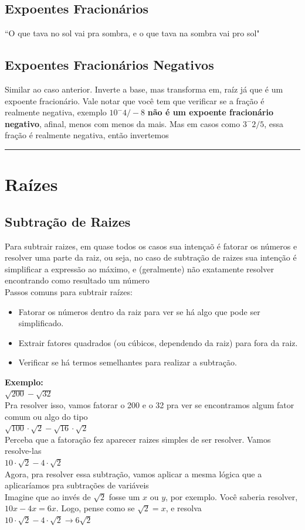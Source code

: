 \documentclass{article}
\begin{document}
\subsection{Expoentes Fracionários}
``O que tava no sol vai pra sombra, e o que tava na sombra vai pro sol"

\subsection{Expoentes Fracionários Negativos}
Similar ao caso anterior. Inverte a base, mas transforma em, raíz já que é um expoente fracionário. Vale notar que você tem que verificar se a fração é realmente negativa, exemplo $10^-4/-8$ \textbf{não é um expoente fracionário negativo}, afinal, menos com menos da mais. Mas em casos como $3^-2/5$, essa fração é realmente negativa, então invertemos
\vspace{10pt}
\hrule
\vspace{10pt}
\section{Raízes}
\subsection{Subtração de Raizes}
Para subtrair raizes, em quase todos os casos sua intençaõ é fatorar os números e resolver uma parte da raiz, ou seja, no caso de subtração de raizes sua intenção é simplificar a expressão ao máximo, e (geralmente) não exatamente resolver encontrando como resultado um número
\\[10pt]
Passos comuns para subtrair raízes:
\begin{itemize}
    \item Fatorar os números dentro da raiz para ver se há algo que pode ser simplificado.
    \item Extrair fatores quadrados (ou cúbicos, dependendo da raiz) para fora da raiz.
    \item Verificar se há termos semelhantes para realizar a subtração.
\end{itemize}
\textbf{Exemplo:}
\\[10pt]
$\sqrt{200} - \sqrt{32}$
\\[5pt] Pra resolver isso, vamos fatorar o 200 e o 32 pra ver se encontramos algum fator comum ou algo do tipo
\\[5pt]
$\sqrt{100} \cdot \sqrt{2} - \sqrt{16} \cdot \sqrt{2}$
\\[5pt]
Perceba que a fatoração fez aparecer raizes simples de ser resolver. Vamos resolve-las
\\[5pt]
$10 \cdot \sqrt{2} - 4 \cdot \sqrt{2}$
\\[5pt]
Agora, pra resolver essa subtração, vamos aplicar a mesma lógica que a aplicaríamos pra subtrações de variáveis
\\[5pt]
Imagine que ao invés de $\sqrt{2}$ fosse um $x$ ou $y$, por exemplo. Você saberia resolver, $10x - 4x = 6x$. Logo, pense como se $\sqrt{2} = x$, e resolva
\\[5pt]
$10 \cdot \sqrt{2} - 4 \cdot \sqrt{2} \xrightarrow{} 6\sqrt{2}$
\end{document}
